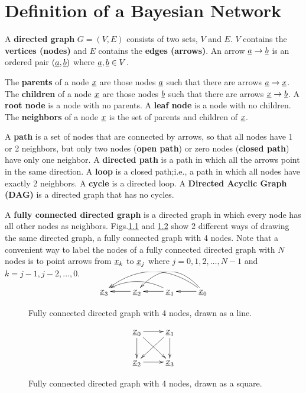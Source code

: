 \chapter{Definition of a Bayesian Network}

\label{ch0-bnet-def}

A {\bf directed graph} $G=(V,E)$
consists of two sets, $V$
and $E$. $V$ contains
the {\bf vertices (nodes)}
and $E$ contains the {\bf edges (arrows)}.
An arrow ${\underline{a}}\rightarrow {\underline{b}}$ is an
ordered pair
$({\underline{a}},{\underline{b}})$ where ${\underline{a}}, {\underline{b}}\in V$.

The {\bf parents}
of a node ${\underline{x}}$ are
those nodes ${\underline{a}}$
such that there are arrows
${\underline{a}}\rightarrow {\underline{x}}$.
The {\bf children} of a node
${\underline{x}}$
are those nodes ${\underline{b}}$
such that there are arrows ${\underline{x}}\rightarrow {\underline{b}}$.
A {\bf root node}
is a node with no parents.
A {\bf leaf node}
is a node with no children.
The {\bf neighbors}
of a node ${\underline{x}}$
is the set of parents and
children of ${\underline{x}}$.

A {\bf path} is a
set of nodes that
are connected
by arrows, so
that all nodes
have 1 or 2 neighbors,
but only two nodes ({\bf open path})
or zero nodes ({\bf closed path})
have only one neighbor.
A {\bf directed path}
is a path in
which all the arrows point
in the same direction.
A {\bf loop}
is a closed path;i.e.,
a path in which all
nodes have exactly 2 neighbors.
A {\bf cycle} is a directed loop.
A {\bf Directed Acyclic Graph (DAG)}
is a directed graph that has no
cycles.


A {\bf fully connected directed graph}
is
a directed graph
in which
every node has all other
nodes as neighbors.
Figs.\ref{fig-full-conn-4-line}
and
\ref{fig-full-conn-4-square}
show 2 different
ways of drawing
the same directed graph,
a fully connected graph with 4 nodes.
Note that a convenient
way
to label
the nodes of a fully
connected directed
graph
with $N$ nodes
is to point
arrows
from
${\underline{x}}_k$ to ${\underline{x}}_j$
where $j=0, 1, 2,\ldots, N-1$
and
$k=j-1, j-2, \ldots, 0$.


\begin{figure}[h!]
$$
\xymatrix{
\rvx_3
&\rvx_2\ar[l]
&\rvx_1\ar[l]\ar@/_1pc/[ll]
&\rvx_0\ar[l]\ar@/_2pc/[ll]\ar@/_2pc/[lll]
}
$$
\caption{Fully
connected directed  graph with 4 nodes,
drawn as a line.}
\label{fig-full-conn-4-line}
\end{figure}

\begin{figure}[h!]
$$
\xymatrix{
\rvx_0\ar[r]\ar[d]\ar[rd]&\rvx_1\ar[d]\ar[ld]
\\
\rvx_2\ar[r]&\rvx_3
}
$$
\caption{Fully
connected directed  graph with 4 nodes,
drawn as a square.}
\label{fig-full-conn-4-square}
\end{figure}


